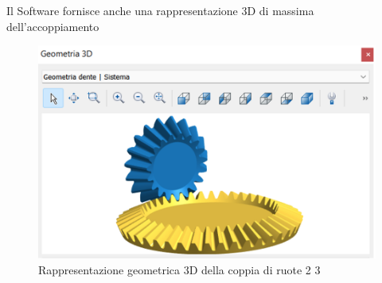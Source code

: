 Il Software fornisce anche una rappresentazione 3D di massima dell’accoppiamento
\begin{figure}[h]
    \centering
    \includegraphics[scale=0.55]{Immagini/GeometriaCoppia23.png}
    \caption{Rappresentazione geometrica 3D della coppia di ruote 2 3}
    \label{fig:GeometriaCoppia23}
\end{figure}































